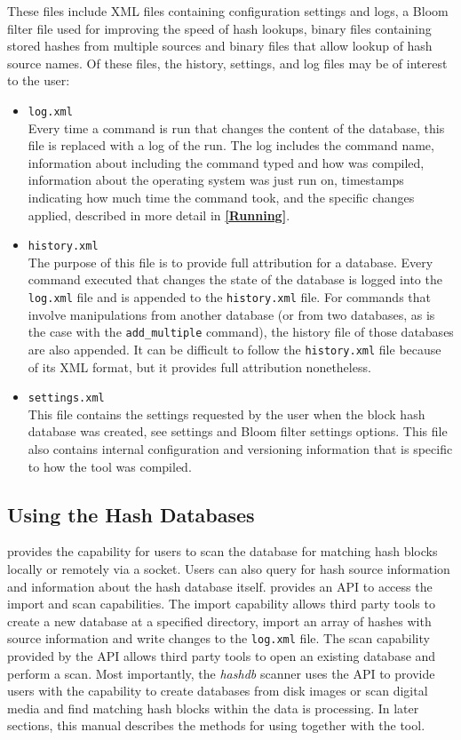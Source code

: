 \documentclass[11pt,fleqn]{article} %
\begin{document}
These files include XML files containing configuration settings and logs, a Bloom filter file used for improving the speed of hash lookups, binary files containing stored hashes from multiple sources and binary files that allow lookup of hash source names. Of these files, the history, settings, and log files may be of interest to the user:
\begin{itemize}
\item \texttt{log.xml} \\
Every time a command is run that changes the content of the database, this file is replaced with a log of the run.
The log includes the command name, information about \hash including the command typed and how \hash was compiled, information about the operating system \hash was just run on, timestamps indicating how much time the command took, and the specific \hash changes applied, described in more detail in \textbf{\autoref{Running}}.
\item \texttt{history.xml} \\
The purpose of this file is to provide full attribution for a database.
Every \hash command executed that changes the state of the database
is logged into the \texttt{log.xml} file and is appended to the \texttt{history.xml} file.
For \hash commands that involve manipulations from another database
(or from two databases, as is the case with the \texttt{add\_multiple} command),
the history file of those databases are also appended.
It can be difficult to follow the \texttt{history.xml} file because of its XML format, but it provides full attribution nonetheless.
\item \texttt{settings.xml} \\
This file contains the settings requested by the user when the block hash database was created, see \hash settings and Bloom filter settings options.
This file also contains internal \hash configuration and versioning information that is specific to how the \hash tool was compiled.
\end{itemize}



\subsection{Using the Hash Databases}
\label{usingSection}
\hash provides the capability for users to scan the database for matching hash blocks locally or remotely via a socket. Users can also query for hash source information and information about the hash database itself. \hash provides an API to access the import and scan capabilities.  The import capability allows third party tools to create a new database at a specified directory, import an array of hashes with source information and write changes to the \texttt{log.xml} file. The scan capability provided by the API allows third party tools to open an existing database and perform a scan. Most importantly, the \bulk \textit{hashdb} scanner uses the \hash API to provide users with the capability to create databases from disk images or scan digital media and find matching hash blocks within the data \bulk is processing. In later sections, this manual describes the methods for using \bulk together with the \hash tool. 
\end{document}
